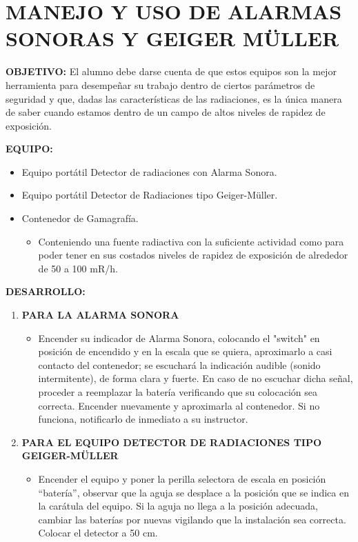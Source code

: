 \section{MANEJO Y USO DE ALARMAS SONORAS Y GEIGER MÜLLER}

\textbf{OBJETIVO:} El alumno debe darse cuenta de que estos equipos son la mejor herramienta para desempeñar su trabajo dentro de ciertos parámetros de seguridad y que, dadas las características de las radiaciones, es la única manera de saber cuando estamos dentro de un campo de altos niveles de rapidez de exposición.

\textbf{EQUIPO:}
\begin{itemize}
    \item Equipo portátil Detector de radiaciones con Alarma Sonora.
    \item Equipo portátil Detector de Radiaciones tipo Geiger-Müller.
    \item Contenedor de Gamagrafía.
    \begin{itemize}
        \item Conteniendo una fuente radiactiva con la suficiente actividad como para poder tener en sus costados niveles de rapidez de exposición de alrededor de 50 a 100 mR/h.
    \end{itemize}
\end{itemize}

\textbf{DESARROLLO:}
\begin{enumerate}
    \item \textbf{PARA LA ALARMA SONORA}
        \begin{itemize}
            \item Encender su indicador de Alarma Sonora, colocando el "switch" en posición de encendido y en la escala que se quiera, aproximarlo a casi contacto del contenedor; se escuchará la indicación audible (sonido intermitente), de forma clara y fuerte. En caso de no escuchar dicha señal, proceder a reemplazar la batería verificando que su colocación sea correcta. Encender nuevamente y aproximarla al contenedor. Si no funciona, notificarlo de inmediato a su instructor.
        \end{itemize}
    \item \textbf{PARA EL EQUIPO DETECTOR DE RADIACIONES TIPO GEIGER-MÜLLER}
        \begin{itemize}
            \item Encender el equipo y poner la perilla selectora de escala en posición ``batería'', observar que la aguja se desplace a la posición que se indica en la carátula del equipo. Si la aguja no llega a la posición adecuada, cambiar las baterías por nuevas vigilando que la instalación sea correcta. Colocar el detector a 50 cm.
        \end{itemize}
\end{enumerate}